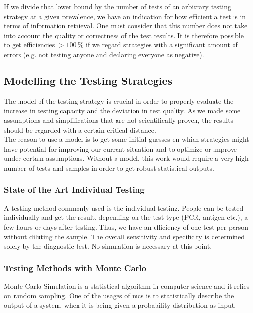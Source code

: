 \documentclass[fleqn,10pt]{wlscirep}
\begin{document}
If we divide that lower bound by the number of tests of an arbitrary testing strategy at a given prevalence, we have an indication for how efficient a test is in terms of information retrieval. One must consider that this number does not take into account the quality or correctness of the test results. It is therefore possible to get efficiencies $> \SI{100}{\percent} $ if we regard strategies with a significant amount of errors (e.g. not testing anyone and declaring everyone as negative). 


\subsection{Modelling the Testing Strategies}

The model of the testing strategy is crucial in order to properly evaluate the increase in testing capacity and the deviation in test quality. As we made some assumptions and simplifications that are not scientifically proven, the results should be regarded with a certain critical distance. \\

The reason to use a model is to get some initial guesses on which strategies might have potential for improving our current situation and to optimize or improve under certain assumptions. Without a model, this work would require a very high number of tests and samples in order to get robust statistical outputs.


\subsubsection{State of the Art Individual Testing}

A testing method commonly used is the individual testing. People can be tested individually and get the result, depending on the test type (PCR, antigen etc.), a few hours or days after testing. Thus, we have an efficiency of one test per person without diluting the sample. The overall sensitivity and specificity is determined solely by the diagnostic test. No simulation is necessary at this point.

\subsubsection{Testing Methods with Monte Carlo}

Monte Carlo Simulation is a statistical algorithm in computer science and it relies on random sampling. One of the usages of {mcs} is to statistically describe the output of a system, when it is being given a probability distribution as input. \\
\end{document}
